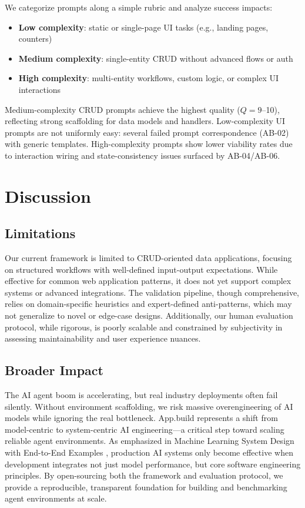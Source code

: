 \documentclass{article}
\begin{document}
We categorize prompts along a simple rubric and analyze success impacts:

\begin{itemize}
\item \textbf{Low complexity}: static or single-page UI tasks (e.g., landing pages, counters)
\item \textbf{Medium complexity}: single-entity CRUD without advanced flows or auth
\item \textbf{High complexity}: multi-entity workflows, custom logic, or complex UI interactions
\end{itemize}

Medium-complexity CRUD prompts achieve the highest quality ($Q=9$--10), reflecting strong scaffolding for data models and handlers. Low-complexity UI prompts are not uniformly easy: several failed prompt correspondence (AB-02) with generic templates. High-complexity prompts show lower viability rates due to interaction wiring and state-consistency issues surfaced by AB-04/AB-06.

\section{Discussion}
\label{sec:discussion}

\subsection{Limitations}
\label{sec:limitations}

Our current framework is limited to CRUD-oriented data applications, focusing on structured workflows with well-defined input-output expectations. While effective for common web application patterns, it does not yet support complex systems or advanced integrations. The validation pipeline, though comprehensive, relies on domain-specific heuristics and expert-defined anti-patterns, which may not generalize to novel or edge-case designs. Additionally, our human evaluation protocol, while rigorous, is poorly scalable and constrained by subjectivity in assessing maintainability and user experience nuances.

\subsection{Broader Impact}
\label{sec:broader-impact}

The AI agent boom is accelerating, but real industry deployments often fail silently. Without environment scaffolding, we risk massive overengineering of AI models while ignoring the real bottleneck. App.build represents a shift from model-centric to system-centric AI engineering—a critical step toward scaling reliable agent environments. As emphasized in Machine Learning System Design with End-to-End Examples \citep{babushkin2025machine}, production AI systems only become effective when development integrates not just model performance, but core software engineering principles. By open-sourcing both the framework and evaluation protocol, we provide a reproducible, transparent foundation for building and benchmarking agent environments at scale.
\end{document}
